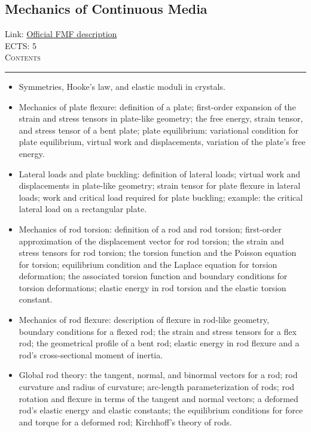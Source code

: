 \documentclass[11pt, a4paper]{article}
\newenvironment{course}[3]{
\subsection{#1}%
Link: \href{#2}{Official FMF description}\\%
ECTS: #3%
\vspace{1ex}
\\
{\large \textsc{Contents}}\\[-0.9ex]%
\rule{\textwidth}{0.5pt}
\vspace{-3ex}
}
{}
\newenvironment{chapter}[1]{
\begin{tcolorbox}[title=#1, breakable]
}
{\end{tcolorbox}}
\begin{document}
\begin{course}{Mechanics of Continuous Media}{https://www.fmf.uni-lj.si/en/study-physics/programmes/1fiz/2020/7000777/courses/1160/}{5}
\begin{chapter}{Fundamentals of the theory of elasticity}
\begin{itemize}
            \item Symmetries, Hooke's law, and elastic moduli in crystals.

            \end{itemize}
    \end{chapter}

    \begin{chapter}{Applications of the theory of elasticity}
        \begin{itemize}

            \item Mechanics of plate flexure: definition of a plate; first-order expansion of the strain and stress tensors in plate-like geometry; the free energy, strain tensor, and stress tensor of a bent plate; plate equilibrium: variational condition for plate equilibrium, virtual work and displacements, variation of the plate's free energy.

            \item Lateral loads and plate buckling: definition of lateral loads; virtual work and displacements in plate-like geometry; strain tensor for plate flexure in lateral loads; work and critical load required for plate buckling; example: the critical lateral load on a rectangular plate.

            \item Mechanics of rod torsion: definition of a rod and rod torsion; first-order approximation of the displacement vector for rod torsion; the strain and stress tensors for rod torsion; the torsion function and the Poisson equation for torsion; equilibrium condition and the Laplace equation for torsion deformation; the associated torsion function and boundary conditions for torsion deformations; elastic energy in rod torsion and the elastic torsion constant.

            \item Mechanics of rod flexure: description of flexure in rod-like geometry, boundary conditions for a flexed rod; the strain and stress tensors for a flex rod; the geometrical profile of a bent rod; elastic energy in rod flexure and a rod's cross-sectional moment of inertia.

            \item Global rod theory: the tangent, normal, and binormal vectors for a rod; rod curvature and radius of curvature; arc-length parameterization of rods; rod rotation and flexure in terms of the tangent and normal vectors; a deformed rod's elastic energy and elastic constants; the equilibrium conditions for force and torque for a deformed rod; Kirchhoff's theory of rods.



\end{itemize}
\end{chapter}
\end{course}
\end{document}
